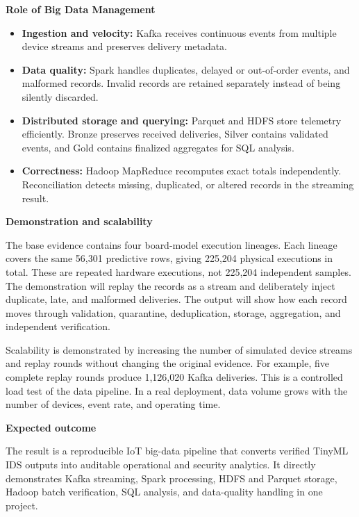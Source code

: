 \documentclass[10pt,a4paper]{article}
\newcommand{\briefsection}[1]{%
  \vspace{2pt}%
  {\large\bfseries\color{heading}#1}\par
  \vspace{1pt}%
}
\begin{document}
\briefsection{Role of Big Data Management}
\begin{itemize}
  \item \textbf{Ingestion and velocity:} Kafka receives continuous events from multiple device streams and preserves delivery metadata.
  \item \textbf{Data quality:} Spark handles duplicates, delayed or out-of-order events, and malformed records. Invalid records are retained separately instead of being silently discarded.
  \item \textbf{Distributed storage and querying:} Parquet and HDFS store telemetry efficiently. Bronze preserves received deliveries, Silver contains validated events, and Gold contains finalized aggregates for SQL analysis.
  \item \textbf{Correctness:} Hadoop MapReduce recomputes exact totals independently. Reconciliation detects missing, duplicated, or altered records in the streaming result.
\end{itemize}

\briefsection{Demonstration and scalability}
The base evidence contains four board-model execution lineages. Each lineage covers the same 56,301 predictive rows, giving 225,204 physical executions in total. These are repeated hardware executions, not 225,204 independent samples. The demonstration will replay the records as a stream and deliberately inject duplicate, late, and malformed deliveries. The output will show how each record moves through validation, quarantine, deduplication, storage, aggregation, and independent verification.

Scalability is demonstrated by increasing the number of simulated device streams and replay rounds without changing the original evidence. For example, five complete replay rounds produce 1,126,020 Kafka deliveries. This is a controlled load test of the data pipeline. In a real deployment, data volume grows with the number of devices, event rate, and operating time.

\briefsection{Expected outcome}
The result is a reproducible IoT big-data pipeline that converts verified TinyML IDS outputs into auditable operational and security analytics. It directly demonstrates Kafka streaming, Spark processing, HDFS and Parquet storage, Hadoop batch verification, SQL analysis, and data-quality handling in one project.
\end{document}
